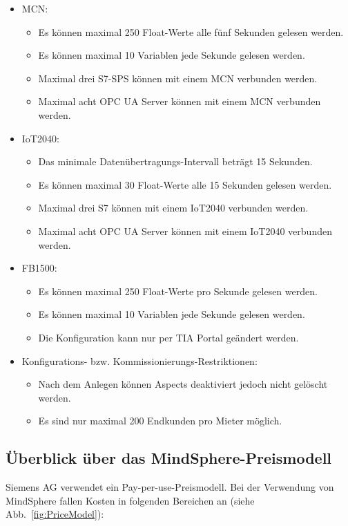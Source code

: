 \begin{itemize}
	\item \acl{MCN}:
    	\begin{itemize}
			\item Es können maximal 250 Float-Werte alle fünf Sekunden gelesen werden.
			\item Es können maximal 10 Variablen jede Sekunde gelesen werden.
			\item Maximal drei S7-\ac{SPS} können mit einem MCN verbunden werden. 
			\item Maximal acht OPC UA Server können mit einem MCN verbunden werden. 
		\end{itemize}
  	\item \ac{IoT2040}:
        \begin{itemize}
			\item Das minimale Datenübertragungs-Intervall beträgt 15 Sekunden.
			\item Es können maximal 30 Float-Werte alle 15 Sekunden gelesen werden.
			\item Maximal drei S7 können mit einem IoT2040 verbunden werden.
			\item Maximal acht OPC UA Server können mit einem IoT2040 verbunden werden.
		\end{itemize}    
  	\item FB1500:
        \begin{itemize}
			\item Es können maximal 250 Float-Werte pro Sekunde gelesen werden.
			\item Es können maximal 10 Variablen jede Sekunde gelesen werden.
			\item Die Konfiguration kann nur per TIA Portal geändert werden.
		\end{itemize}
     \item Konfigurations- bzw. Kommissionierungs-Restriktionen:
         \begin{itemize}
			\item Nach dem Anlegen können Aspects deaktiviert jedoch nicht gelöscht werden.
			\item Es sind nur maximal 200 Endkunden pro Mieter möglich.
		\end{itemize}
\end{itemize}

\subsection{Überblick über das MindSphere-Preismodell}
Siemens AG verwendet ein Pay-per-use-Preismodell. Bei der Verwendung von MindSphere fallen Kosten in folgenden Bereichen an (siehe Abb.~\ref{fig:PriceModel}):


